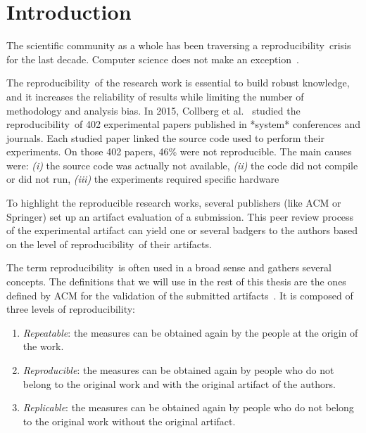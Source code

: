 \documentclass[sigconf,natbib=false]{acmart}
\newcommand{\repro}{reproducibility}
\begin{document}
\maketitle


\section{Introduction}

The scientific community as a whole has been traversing a \repro\ crisis for the last decade.
Computer science does not make an exception\ \cite{randallIrreproducibilityCrisisModern2018,baker500ScientistsLift2016}.

The \repro\ of the research work is essential to build robust knowledge, and it increases the reliability of results while limiting the number of methodology and analysis bias.
In 2015, Collberg et al.\ \cite{collberg_repeatability_2015} studied the \repro\ of 402 experimental papers published in *system* conferences and journals.
Each studied paper linked the source code used to perform their experiments. 
On those 402 papers, 46\% were not reproducible.
The main causes were:
\emph{(i)} the source code was actually not available,
\emph{(ii)} the code did not compile or did not run,
\emph{(iii)} the experiments required specific hardware

To highlight the reproducible research works, several publishers (like ACM or Springer) set up an artifact evaluation of a submission.
This peer review process of the experimental artifact can yield one or several badgers to the authors based on the level of \repro\ of their artifacts.

The term \repro\ is often used in a broad sense and gathers several concepts.
The definitions that we will use in the rest of this thesis are the ones defined by ACM for the validation of the submitted artifacts\ \cite{acm-badges}.
It is composed of three levels of \repro:

\begin{enumerate}
\item \emph{Repeatable}: the measures can be obtained again by the people at the origin of the work.
\item \emph{Reproducible}: the measures can be obtained again by people who do not belong to the original work and with the original artifact of the authors.
\item \emph{Replicable}: the measures can be obtained again by people who do not belong to the original work without the original artifact.
\end{enumerate}
\end{document}
